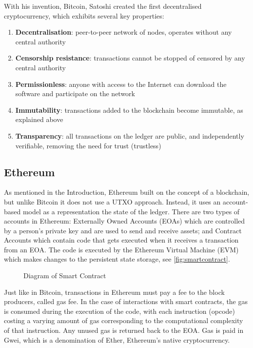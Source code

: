 With his invention, Bitcoin, Satoshi created the first decentralised cryptocurrency, which exhibits several key properties:

\begin{enumerate}
    \item \textbf{Decentralisation}: peer-to-peer network of nodes, operates without any central authority
    \item  \textbf{Censorship resistance}: transactions cannot be stopped of censored by any central authority
    \item  \textbf{Permissionless}: anyone with access to the Internet can download the software and participate on the network
    \item  \textbf{Immutability}: transactions added to the blockchain become immutable, as explained above
    \item  \textbf{Transparency}: all transactions on the ledger are public, and independently verifiable, removing the need for trust (trustless)
\end{enumerate}

\vspace{0.5cm}


\subsection{Ethereum}

As mentioned in the Introduction, Ethereum built on the concept of a blockchain, but unlike Bitcoin it does not use a UTXO approach. Instead, it uses an account-based model as a representation the state of the ledger. There are two types of accounts in Ethereum: Externally Owned Accounts (EOAs) which are controlled by a person's private key and are used to send and receive assets; and Contract Accounts which contain code that gets executed when it receives a transaction from an EOA. The code is executed by the Ethereum Virtual Machine (EVM) which makes changes to the persistent state storage, see \autoref{fig:smartcontract}.

\begin{figure}[h]
    \centering
    \captionsetup{justification=centering}
    
    \caption[Diagram of Smart Contract]{Diagram of Smart Contract}
    \label{fig:smartcontract}
\end{figure}

Just like in Bitcoin, transactions in Ethereum must pay a fee to the block producers, called gas fee. In the case of interactions with smart contracts, the gas is consumed during the execution of the code, with each instruction (opcode) costing a varying amount of gas corresponding to the computational complexity of that instruction. Any unused gas is returned back to the EOA. Gas is paid in Gwei, which is a denomination of Ether, Ethereum's native cryptocurrency.

